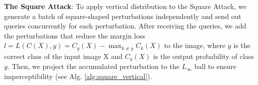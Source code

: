 
\textbf{The Square Attack}: To apply vertical distribution to the Square Attack, we generate a batch of square-shaped perturbations independently and send out queries concurrently for each perturbation. After receiving the queries, we add the perturbations that reduce the margin loss $l=L(C(X), y)=C_y(X)-\max_{k \neq y}C_k(X)$ to the image, where $y$ is the correct class of the input image X and $C_y(X)$ is the output probability of class $y$. Then, we project the accumulated perturbation to the $L_\infty$ ball to ensure imperceptibility (see Alg. \ref{alg:square_vertical}).





